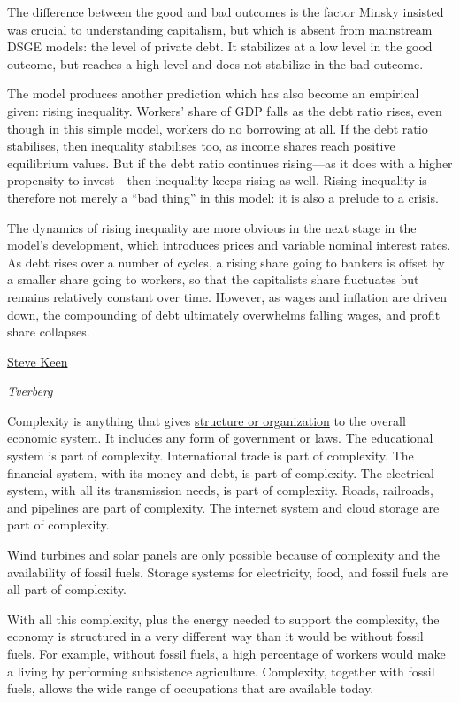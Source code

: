 \documentclass[
]{book}
\begin{document}
The difference between the good and bad outcomes is the factor Minsky insisted was crucial to understanding capitalism, but which is absent from mainstream DSGE models: the level of private debt. It stabilizes at a low level in the good outcome, but reaches a high level and does not stabilize in the bad outcome.

The model produces another prediction which has also become an empirical given: rising inequality. Workers' share of GDP falls as the debt ratio rises, even though in this simple model, workers do no borrowing at all. If the debt ratio stabilises, then inequality stabilises too, as income shares reach positive equilibrium values. But if the debt ratio continues rising---as it does with a higher propensity to invest---then inequality keeps rising as well. Rising inequality is therefore not merely a ``bad thing'' in this model: it is also a prelude to a crisis.

The dynamics of rising inequality are more obvious in the next stage in the model's development, which introduces prices and variable nominal interest rates. As debt rises over a number of cycles, a rising share going to bankers is offset by a smaller share going to workers, so that the capitalists share fluctuates but remains relatively constant over time. However, as wages and inflation are driven down, the compounding of debt ultimately overwhelms falling wages, and profit share collapses.

\href{https://evonomics.com/why-economists-have-to-embrace-complexity-steve-keen/}{Steve Keen}

\emph{Tverberg}

Complexity is anything that gives \href{https://ourfiniteworld.com/2023/02/03/ramping-up-wind-turbines-solar-panels-and-electric-vehicles-cant-solve-our-energy-problem/}{structure or organization} to the overall economic system. It includes any form of government or laws. The educational system is part of complexity. International trade is part of complexity. The financial system, with its money and debt, is part of complexity. The electrical system, with all its transmission needs, is part of complexity. Roads, railroads, and pipelines are part of complexity. The internet system and cloud storage are part of complexity.

Wind turbines and solar panels are only possible because of complexity and the availability of fossil fuels. Storage systems for electricity, food, and fossil fuels are all part of complexity.

With all this complexity, plus the energy needed to support the complexity, the economy is structured in a very different way than it would be without fossil fuels. For example, without fossil fuels, a high percentage of workers would make a living by performing subsistence agriculture. Complexity, together with fossil fuels, allows the wide range of occupations that are available today.
\end{document}
